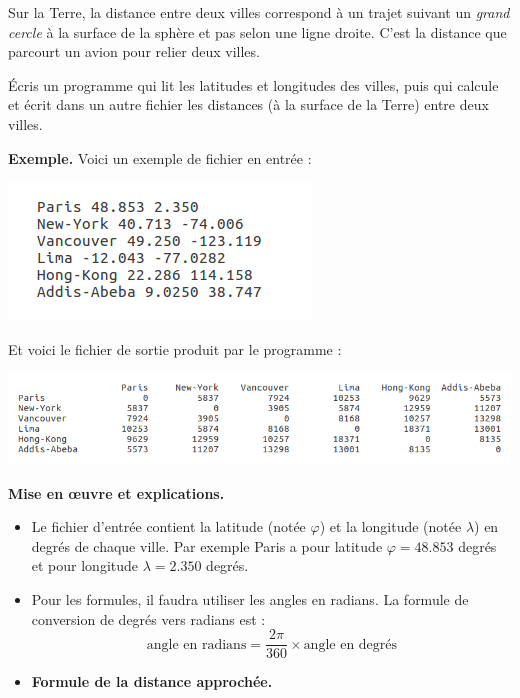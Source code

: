 \documentclass[11pt,class=report,crop=false]{standalone}
\begin{document}
\begin{activite}
\begin{enumerate}
Sur la Terre, la distance entre deux villes correspond à un trajet suivant un \emph{grand cercle} à la surface de la sphère et pas selon une ligne droite. C'est la distance que parcourt un avion pour relier deux villes.

 Écris un programme qui lit les latitudes et longitudes des villes, puis qui calcule et écrit dans un autre fichier les distances (à la surface de la Terre) entre deux villes. 
  
\textbf{Exemple.} Voici un exemple de fichier en entrée :
\begin{center}
\includegraphics[scale=0.7]{ecran-fichiers-4c}
\end{center}   

Et voici le fichier de sortie produit par le programme :
\begin{center}
\includegraphics[scale=0.55]{ecran-fichiers-4d} 
\end{center}  
    
    
\textbf{Mise en \oe uvre et explications.}

\begin{itemize}
	\item Le fichier d'entrée contient la latitude (notée $\varphi$) et la longitude (notée $\lambda$) en degrés de chaque ville. Par exemple Paris a pour latitude $\varphi = 48.853$ degrés et pour longitude $\lambda = 2.350$ degrés.
	
	\item Pour les formules, il faudra utiliser les angles en radians. La formule de conversion de degrés vers radians est :
	$$\text{angle en radians} = \frac{2\pi}{360} \times \text{angle en degrés}$$
		
	\item \textbf{Formule de la distance approchée.}
	

\end{itemize}
\end{enumerate}
\end{activite}
\end{document}

